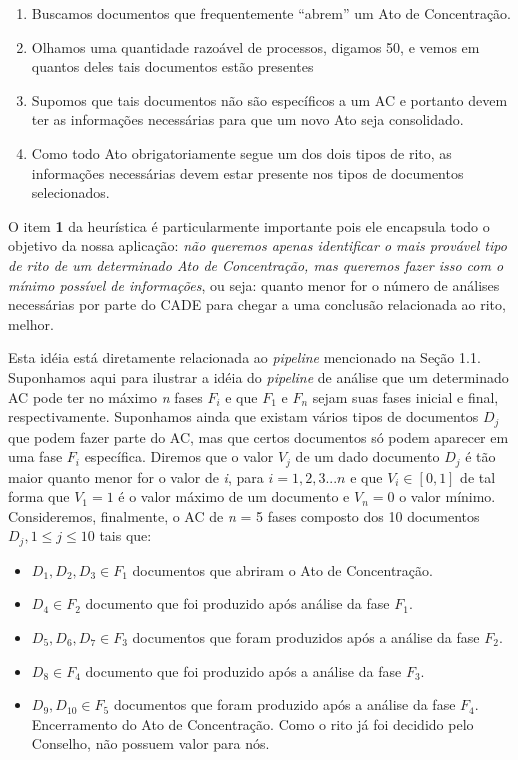 \documentclass[11pt]{report}
\newcommand{\quotes}[1]{``#1''}
\begin{document}
\begin{enumerate}[label=\textbf{\arabic*.}]
\item Buscamos documentos que frequentemente \quotes{abrem} um Ato de Concentração.
\item Olhamos uma quantidade razoável de processos, digamos 50, e vemos em quantos deles tais documentos estão presentes
\item Supomos que tais documentos não são específicos a um AC e portanto devem ter as informações necessárias para que um novo Ato seja consolidado.
\item Como todo Ato obrigatoriamente segue um dos dois tipos de rito, as informações necessárias devem estar presente nos tipos de documentos selecionados.
\end{enumerate}

O item \textbf{1} da heurística é particularmente importante pois ele encapsula todo o objetivo da nossa aplicação: \textit{não queremos apenas identificar o mais provável tipo de rito
de um determinado Ato de Concentração, mas queremos fazer isso com o mínimo possível de informações}, ou seja: quanto menor for o número de análises necessárias por parte do CADE para 
chegar a uma conclusão relacionada ao rito, melhor.

Esta idéia está diretamente relacionada ao \textit{pipeline} mencionado na Seção 1.1. Suponhamos aqui para ilustrar a idéia do
\textit{pipeline} de análise que um determinado AC pode ter no máximo \textit{n} fases $F_i$ e que $F_1$ e $F_n$ sejam suas fases inicial e final, respectivamente.
Suponhamos ainda que existam vários tipos de documentos $D_j$ que podem fazer parte do AC, mas que certos documentos só podem aparecer em uma fase $F_i$ específica.
Diremos que o valor $V_j$ de um dado documento $D_j$ é tão maior quanto menor for o valor de \textit{i}, para $i = 1, 2, 3 ... n$ e que $V_i \in [0, 1]$ de tal
forma que $V_1 = 1$ é o valor máximo de um documento e $V_n = 0$ o valor mínimo.
Consideremos, finalmente, o AC de \textit{n} = 5 fases composto dos 10 documentos $D_j, 1 \leq j \leq 10$ tais que:

\begin{itemize}
  \item $D_1, D_2, D_3 \in F_1$ documentos que abriram o Ato de Concentração.
  \item $D_4 \in F_2$ documento que foi produzido após análise da fase $F_1$.
  \item $D_5, D_6, D_7 \in F_3$ documentos que foram produzidos após a análise da fase $F_2$.
  \item $D_8 \in F_4$ documento que foi produzido após a análise da fase $F_3$.
  \item $D_9, D_{10} \in F_5$ documentos que foram produzido após a análise da fase $F_4$. Encerramento do Ato de Concentração. Como o rito já foi decidido pelo Conselho,
  não possuem valor para nós.
\end{itemize}
\end{document}
